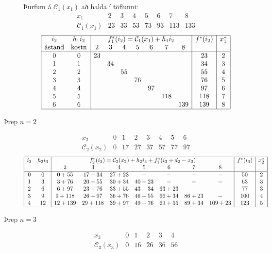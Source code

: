 \begin{lausnSYND}
\begin{description}
Þurfum á $\mathcal{C}_1(x_1)$ að halda í töflunni:
\[ \begin{array}{cccccccc} x_1 & 2 &3&4&5&6&7&8\\\hline\mathcal{C}_1(x_1)&23&33&53&73&93&113&133\end{array}\]
{\scriptsize
\[\begin{array}{|cc|ccccccc|c|c|}\hline
  i_2 & h_1i_2 & \multicolumn{7}{c|}{f_1^*(i_2)=\mathcal{C}_1(x_1)+h_1i_2} & f^*(i_2) & x_1^* \\
\mbox{ástand} & \mbox{kostn} & 2 & 3 & 4 & 5 & 6 & 7 &8 &&\\ \hline 
0 & 0 & 23 &&&&&&& 23 & 2 \\
1 & 1 && 34 &&&&&& 34 & 3 \\
2 & 2 &&& 55 &&&&& 55 & 4 \\
3 & 3 &&&& 76 &&&& 76 & 5 \\
4 & 4 &&&&& 97 &&& 97 & 6 \\
5 & 5 &&&&&&118 && 118& 7 \\
6 & 6 &&&&&&& 139 & 139& 8 \\
\hline \end{array}\]}
\item[Þrep $n=2$]
\[ \begin{array}{cccccccc} x_2 & 0&1&2 &3&4&5&6\\\hline\mathcal{C}_2(x_2)&0&17&27&37&57&77&97\end{array}\]
{\scriptsize
\[\begin{array}{|cc|ccccccc|c|c|}\hline
  i_3 & h_2i_3 & \multicolumn{7}{c|}{f_2^*(i_3)=\mathcal{C}_2(x_2)+h_2i_3+f_1^*(i_3+d_2-x_2)} & f^*(i_3) & x_2^* \\
 &  & 2 & 3 & 4 & 5 & 6 & 7 &8 &&\\ \hline 
0 & 0 & 0+55 &17+34&27+23&-&-&-&-& 50 & 2 \\
1 & 3 &3+76& 20+55 &30+34&40+23&-&-&-& 63 & 3 \\
2 & 6 &6+97&23+76&33+55 &43+34&63+23&-&-& 77 & 3 \\
3 & 9 &9+118&26+97&36+76&46+55&66+34&86+23&-& 100 & 4 \\
4 & 12 &12+139&29+118&39+97&49+76&69+55&89+34&109+23& 123 & 5 \\
\hline \end{array}\]}
\item[Þrep $n=3$]
\[ \begin{array}{cccccc} x_3 & 0&1&2 &3&4\\\hline\mathcal{C}_3(x_3)&0&16&26&36&56\end{array}\]
{\scriptsize
}
\end{description}
\end{lausnSYND}

